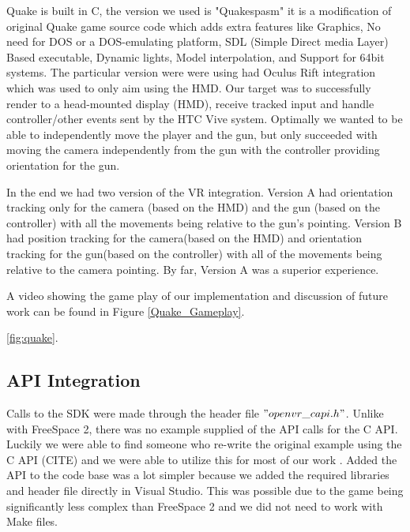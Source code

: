 \documentclass[journal]{IEEEtran}
\begin{document}
 Quake is built in C, the version we used is "Quakespasm" it is a modification of original Quake game source code which adds extra features like Graphics, No need for DOS or a DOS-emulating platform, SDL (Simple Direct media Layer) Based executable, Dynamic lights, Model interpolation, and Support for 64bit systems. The particular version were were using had Oculus Rift integration which was used to only aim using the HMD. Our target was  to successfully render to a head-mounted display (HMD), receive tracked input and handle controller/other events sent by the HTC Vive system. Optimally we wanted to be able to independently move the player and the gun, but only succeeded with moving the camera independently from the gun with the controller providing orientation for the gun.
 
 In the end we had two version of the VR integration. Version A had orientation tracking only for the camera (based on the HMD) and the gun (based on the controller) with all the movements being relative to the gun's pointing. Version B had position tracking for the camera(based on the HMD) and orientation tracking for the gun(based on the controller) with all of the movements being relative to the camera pointing. By far, Version A was a superior experience. 
 
  A video showing the game play of our implementation and discussion of future work can be found in Figure \ref{Quake_Gameplay}.


\begin{figure}[h!]
	\noindent
\end{figure}
 \ref{fig:quake}.


\subsection{API Integration}
Calls to the SDK were made through the header file $"openvr\_capi.h"$. Unlike with FreeSpace 2, there was no example supplied of the API calls for the C API. Luckily we were able to find someone who re-write the original example using the C API (CITE) and we were able to utilize this for most of our work . Added the API to the code base was a lot simpler because we added the required libraries and header file directly in Visual Studio. This was possible due to the game being significantly less complex than FreeSpace 2 and we did not need to work with Make files.      
\end{document}
